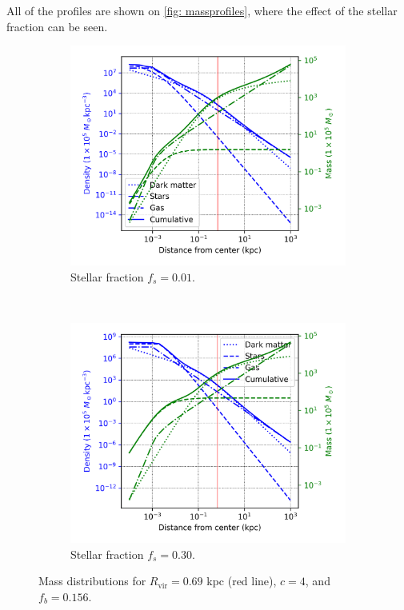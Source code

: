 		All of the profiles are shown on \autoref{fig: massprofiles}, where the effect of the stellar fraction can be seen.
		
		\begin{figure}[h]
			\centering
			\begin{subfigure}[b]{0.49\textwidth}
				\includegraphics[width=\textwidth]{"../Files/Week 6/density_mass_fs01"}
				\caption{Stellar fraction $f_s = 0.01$.}
				\label{fig: baryonicprofilehigh}
			\end{subfigure}
			~ 
			\begin{subfigure}[b]{0.49\textwidth}
				\includegraphics[width=\textwidth]{"../Files/Week 6/density_mass_fs3"}
				\caption{Stellar fraction $f_s = 0.30$.}
				\label{fig: baryonicprofilelow}
			\end{subfigure}
			\caption{Mass distributions for $R_\text{vir} = 0.69$ kpc (red line), $c = 4$, and $f_b = 0.156$.}
			\label{fig: massprofiles}
		\end{figure}
	
